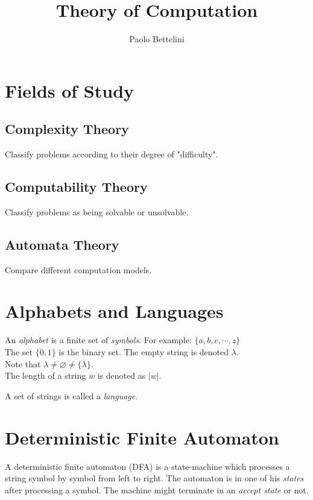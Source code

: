 \documentclass{article}
\title{Theory of Computation}
\author{Paolo Bettelini}
\date{}
\newcommand{\emptyString}{\lambda}
\begin{document}
\maketitle
\tableofcontents
\pagebreak

\section{Fields of Study}

\subsection{Complexity Theory}

Classify problems according to their degree
of "difficulty".

\subsection{Computability Theory}

Classify problems as being solvable or unsolvable.

\subsection{Automata Theory}

Compare different computation models.

\section{Alphabets and Languages}

An \textit{alphabet} is a finite set of \textit{symbols}.
For example: \(\{a,b,c,\cdots, z\}\)\\
The set \(\{0,1\}\) is the binary set.
The empty string is denoted \(\emptyString\).
\\
Note that \(\emptyString \neq \varnothing \neq \{\emptyString\}\).
\\
The length of a string \(w\) is denoted as \(|w|\).

A set of strings is called a \textit{language}.

\section{Deterministic Finite Automaton}

A deterministic finite automaton (DFA) is a state-machine which processes a string
symbol by symbol from left to right. The automaton is in one of his \textit{states}
after processing a symbol. The machine might terminate in an
\textit{accept state} or not.
\end{document}
